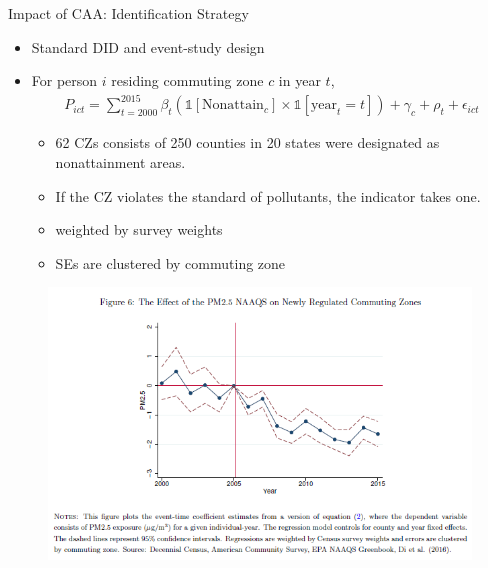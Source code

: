 \documentclass[dvipdfmx,12pt]{beamer}
\begin{document}
\begin{frame}{Impact of CAA: Identification Strategy}
  \begin{itemize}
    \item Standard DID and event-study design
    \item For person $i$ residing commuting zone $c$ in year $t$,
    \begin{align*}
      P_{ict} = \sum_{t = 2000}^{2015} \beta_t (\mathbb{1}[\text{Nonattain}_c] \times \mathbb{1}[\text{year}_t = t]) + \gamma_c + \rho_t + \epsilon_{ict}
    \end{align*}
    \begin{itemize}
      \item 62 CZs consists of 250 counties in 20 states were designated as nonattainment areas.
      \item If the CZ violates the standard of pollutants, the indicator takes one.
      \item weighted by survey weights
      \item SEs are clustered by commuting zone
    \end{itemize}
  \end{itemize}
\end{frame}

\begin{frame}{}
  \begin{figure}
    \centering
    \includegraphics[scale = .6]{F6.png}
  \end{figure}
\end{frame}
\end{document}
